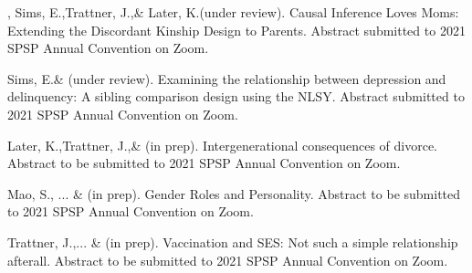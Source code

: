 \item \meb, Sims, E.,\notb Trattner, J.,\nota \& Later, K.\notans (under review). Causal Inference Loves Moms: Extending the Discordant Kinship Design to Parents. Abstract submitted to 2021 SPSP Annual Convention on Zoom.
%
\item Sims, E.\notbns \& \meb (under review). Examining the relationship between depression and delinquency: A sibling comparison design using the NLSY. Abstract submitted to 2021 SPSP Annual Convention on Zoom.
%
\item Later, K.,\nota Trattner, J.,\nota \& \meb (in prep). Intergenerational consequences of divorce. Abstract to be submitted to 2021 SPSP Annual Convention on Zoom.
%
\item Mao, S.\nota, ... \& \meb (in prep). Gender Roles and Personality. Abstract to be submitted to 2021 SPSP Annual Convention on Zoom.
%
\item Trattner, J.,\nota ... \& \meb (in prep). Vaccination and SES: Not such a simple relationship afterall. Abstract to be submitted to 2021 SPSP Annual Convention on Zoom.